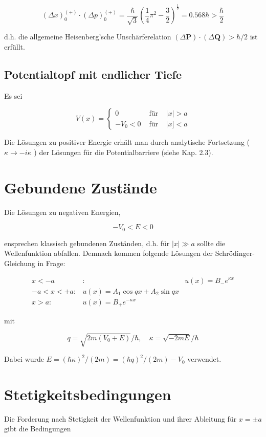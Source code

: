 \documentclass[10pt, letterpaper]{article}
\begin{document}
$$
(\Delta x)_{0}^{(+)} \cdot(\Delta p)_{0}^{(+)}=\frac{\hbar}{\sqrt{3}}\left(\frac{1}{4} \pi^{2}-\frac{3}{2}\right)^{\frac{1}{2}}=0.568 \hbar>\frac{\hbar}{2}
$$

d.h. die allgemeine Heisenberg'sche Unschärferelation $(\Delta \mathbf{P}) \cdot(\Delta \mathbf{Q})>\hbar / 2$ ist erfüllt.

\subsection*{Potentialtopf mit endlicher Tiefe}
Es sei

$$
V(x)=\left\{\begin{array}{rcr}
0 & \text { für } & |x|>a \\
-V_{0}<0 & \text { für } & \mid x]<a
\end{array}\right.
$$

Die Lösungen zu positiver Energie erhält man durch analytische Fortsetzung ( $\kappa \rightarrow-i \kappa$ ) der Lösungen für die Potentialbarriere (siehe Kap. 2.3).

\section*{Gebundene Zustände}
Die Lösungen zu negativen Energien,

$$
-V_{0}<E<0
$$

ensprechen klassisch gebundenen Zuständen, d.h. für $|x| \gg a$ sollte die Wellenfunktion abfallen. Demnach kommen folgende Lösungen der Schrödinger-Gleichung in Frage:

$$
\begin{array}{rll}
x<-a & : & u(x)=B_{-} e^{\kappa x} \\
-a<x<+a: & u(x)=A_{1} \cos q x+A_{2} \sin q x \\
x>a: & u(x)=B_{+} e^{-\kappa x}
\end{array}
$$

mit

$$
q=\sqrt{2 m\left(V_{0}+E\right)} / \hbar, \quad \kappa=\sqrt{-2 m E} / \hbar
$$

Dabei wurde $E=(\hbar \kappa)^{2} /(2 m)=(\hbar q)^{2} /(2 m)-V_{0}$ verwendet.

\section*{Stetigkeitsbedingungen}
Die Forderung nach Stetigkeit der Wellenfunktion und ihrer Ableitung für $x= \pm a$ gibt die Bedingungen
\end{document}
